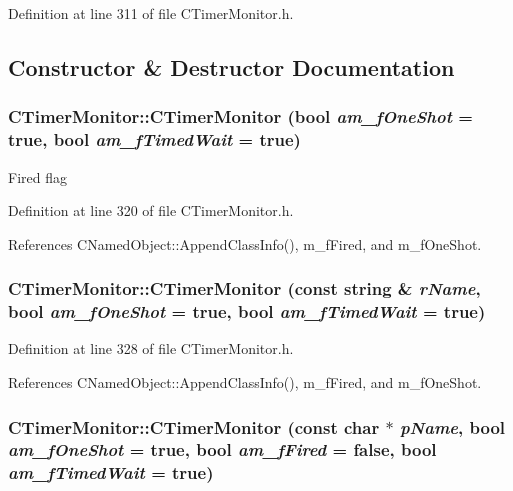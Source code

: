 Definition at line 311 of file CTimer\-Monitor.h.

\subsection{Constructor \& Destructor Documentation}
\subsubsection{\setlength{\rightskip}{0pt plus 5cm}CTimer\-Monitor::CTimer\-Monitor (bool {\em am\_\-f\-One\-Shot} = true, bool {\em am\_\-f\-Timed\-Wait} = true)\hspace{0.3cm}{\tt  [inline]}}\label{classCTimerMonitor_a0}


Fired flag 

Definition at line 320 of file CTimer\-Monitor.h.

References CNamed\-Object::Append\-Class\-Info(), m\_\-f\-Fired, and m\_\-f\-One\-Shot.
\subsubsection{\setlength{\rightskip}{0pt plus 5cm}CTimer\-Monitor::CTimer\-Monitor (const string \& {\em r\-Name}, bool {\em am\_\-f\-One\-Shot} = true, bool {\em am\_\-f\-Timed\-Wait} = true)\hspace{0.3cm}{\tt  [inline]}}\label{classCTimerMonitor_a1}




Definition at line 328 of file CTimer\-Monitor.h.

References CNamed\-Object::Append\-Class\-Info(), m\_\-f\-Fired, and m\_\-f\-One\-Shot.
\subsubsection{\setlength{\rightskip}{0pt plus 5cm}CTimer\-Monitor::CTimer\-Monitor (const char $\ast$ {\em p\-Name}, bool {\em am\_\-f\-One\-Shot} = true, bool {\em am\_\-f\-Fired} = false, bool {\em am\_\-f\-Timed\-Wait} = true)\hspace{0.3cm}{\tt  [inline]}}\label{classCTimerMonitor_a2}




